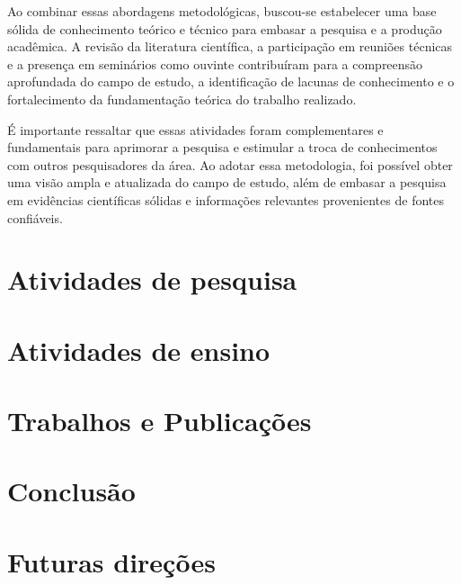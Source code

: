 Ao combinar essas abordagens metodológicas, buscou-se estabelecer uma base sólida de conhecimento teórico e técnico para embasar a pesquisa e a produção acadêmica. A revisão da literatura científica, a participação em reuniões técnicas e a presença em seminários como ouvinte contribuíram para a compreensão aprofundada do campo de estudo, a identificação de lacunas de conhecimento e o fortalecimento da fundamentação teórica do trabalho realizado.

É importante ressaltar que essas atividades foram complementares e fundamentais para aprimorar a pesquisa e estimular a troca de conhecimentos com outros pesquisadores da área. Ao adotar essa metodologia, foi possível obter uma visão ampla e atualizada do campo de estudo, além de embasar a pesquisa em evidências científicas sólidas e informações relevantes provenientes de fontes confiáveis.

\section{Atividades de pesquisa}\label{cap:pesquisa}

\lipsum[4]

\section{Atividades de ensino}\label{cap:ensino}

\lipsum[4]

\section{Trabalhos e Publicações}\label{cap:pub}

\lipsum[4]

\section{Conclusão}\label{cap:conclusao}

\lipsum[4]

\section{Futuras direções}\label{cap:futuro}

\lipsum[4]









